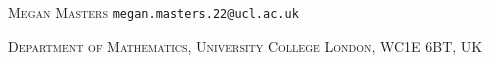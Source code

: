 \documentclass[11pt]{article}
\begin{document}







\bigskip

\small\textsc{Megan Masters} \texttt{megan.masters.22@ucl.ac.uk}

\small\textsc{Department of Mathematics,
University College London,
 WC1E 6BT, UK}
\end{document}
